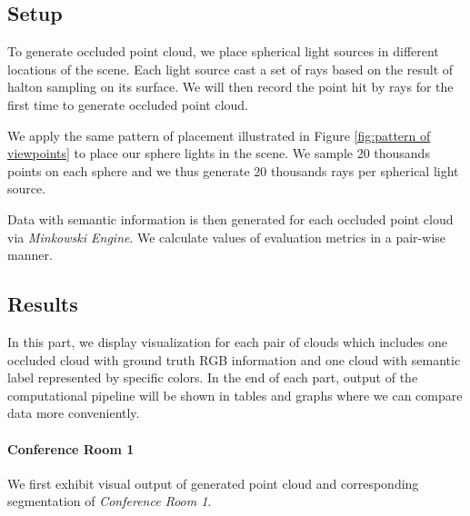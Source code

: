 \documentclass[11pt, a4paper,oneside,chapterprefix=false]{scrbook}
\begin{document}
\subsection{Setup}

To generate occluded point cloud, we place spherical light sources in different locations of the scene. Each light source cast a set of rays based on the result of halton sampling on its surface. We will then record the point hit by rays for the first time to generate occluded point cloud.

\vspace{10pt}

We apply the same pattern of placement illustrated in Figure \ref{fig:pattern of viewpoints} to place our sphere lights in the scene. We sample 20 thousands points on each sphere and we thus generate 20 thousands rays per spherical light source.

\vspace{10pt}

Data with semantic information is then generated for each occluded point cloud via \emph{Minkowski Engine}. We calculate values of evaluation metrics in a pair-wise manner.


\subsection{Results}

In this part, we display visualization for each pair of clouds which includes one occluded cloud with ground truth RGB information and one cloud with semantic label represented by specific colors. In the end of each part, output of the computational pipeline will be shown in tables and graphs where we can compare data more conveniently.

\paragraph{Conference Room 1}

We first exhibit visual output of generated point cloud and corresponding segmentation of \emph{Conference Room 1}.
\end{document}
